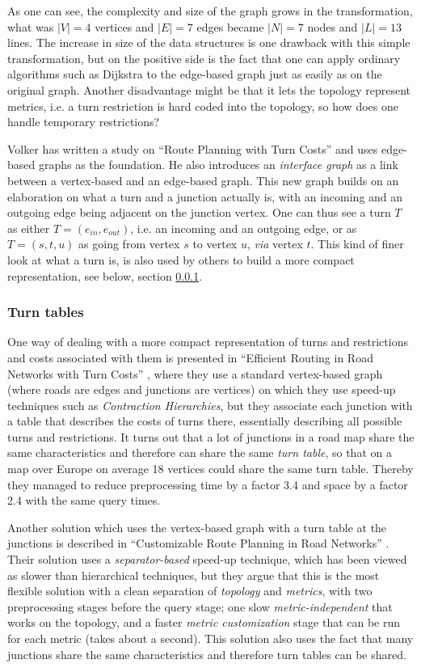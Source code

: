 \documentclass[../main.tex]{subfiles}
\begin{document}
As one can see, the complexity and size of the graph grows in the transformation, what was $|V| = 4$ vertices and $|E| = 7$ edges became $|N| = 7$ nodes and $|L| = 13$ lines. The increase in size of the data structures is one drawback with this simple transformation, but on the positive side is the fact that one can apply ordinary algorithms such as Dijkstra to the edge-based graph just as easily as on the original graph. Another disadvantage might be that it lets the topology represent metrics, i.e. a turn restriction is hard coded into the topology, so how does one handle temporary restrictions?

Volker \cite{volker-turncost} has written a study on ``Route Planning with Turn Costs'' and uses edge-based graphs as the foundation. He also introduces an \emph{interface graph} as a link between a vertex-based and an edge-based graph. This new graph builds on an elaboration on what a turn and a junction actually is, with an incoming and an outgoing edge being adjacent on the junction vertex. One can thus see a turn $T$ as either $T = (e_{in}, e_{out})$, i.e. an incoming and an outgoing edge, or as $T = (s,t,u)$ as going from vertex $s$ to vertex $u$, \emph{via} vertex $t$. This kind of finer look at what a turn is, is also used by others to build a more compact representation, see below, section \ref{compact-turn}.

\subsubsection{Turn tables} \label{compact-turn}
One way of dealing with a more compact representation of turns and restrictions and costs associated with them is presented in ``Efficient Routing in Road Networks with Turn Costs'' \cite{geisberger-vetter-turn-cost-2011}, where they use a standard vertex-based graph (where roads are edges and junctions are vertices) on which they use speed-up techniques such as \emph{Contraction Hierarchies}, but they associate each junction with a table that describes the costs of turns there, essentially describing all possible turns and restrictions. It turns out that a lot of junctions in a road map share the same characteristics and therefore can share the same \emph{turn table}, so that on a map over Europe on average 18 vertices could share the same turn table. Thereby they managed to reduce preprocessing time by a factor 3.4 and space by a factor 2.4 with the same query times.

Another solution which uses the vertex-based graph with a turn table at the junctions is described in ``Customizable Route Planning in Road Networks'' \cite[p.6]{crp-2013}. Their solution uses a \emph{separator-based} speed-up technique, which has been viewed as slower than hierarchical techniques, but they argue that this is the most flexible solution with a clean separation of \emph{topology} and \emph{metrics}, with two preprocessing stages before the query stage; one slow \emph{metric-independent} that works on the topology, and a faster \emph{metric customization} stage that can be run for each metric (takes about a second). This solution also uses the fact that many junctions share the same characteristics and therefore turn tables can be shared.
\end{document}
